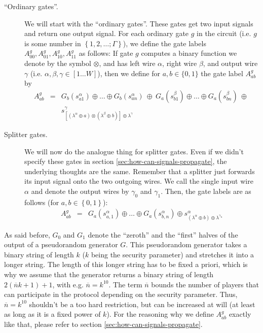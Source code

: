 \message{ !name(seminar.tex)}\documentclass{llncs}
\newcommand{\todo}[1]{ {\color{red}{\textbf{#1}}}}
\begin{document}
\begin{description}
\item[``Ordinary gates''.] We will start with the ``ordinary gates''. These gates get two input signals and return one output signal. For each ordinary gate $g$ in the circuit (i.e. $g$ is some number in $\left\{ 1,2,\dots;\Gamma \right\}$), we define the gate labels $A^g_{00}, A^g_{01}, A^g_{10}, A^g_{11}$ as follows: If gate $g$ computes a binary function we denote by the symbol $\otimes$, and has left wire $\alpha$, right wire $\beta$, and output wire $\gamma$ (i.e. $\alpha,\beta,\gamma\in[1\dots W]$), then we define for $a,b\in\{0,1\}$ the gate label $A_{ab}^g$ by
  \begin{eqnarray*}
    A_{ab}^g &= & G_b(s_{a1}^\alpha)\oplus\dots\oplus G_b(s_{an}^\alpha) 
              \ \oplus \ 
              G_a(s_{b1}^\beta)\oplus\dots\oplus G_a(s_{bn}^\beta)
              \ \oplus \ \\
             & & s_{[(\lambda^\alpha\oplus a)\otimes(\lambda^\beta\oplus b)]\oplus\lambda^\gamma}^\gamma
  \end{eqnarray*}
\item[Splitter gates.] We will now do the analogue thing for splitter gates. Even if we didn't specify these gates in section \ref{sec:how-can-signals-propagate}, the underlying thoughts are the same. Remember that a splitter just forwards its input signal onto the two outgoing wires. We call the single input wire $\alpha$ and denote the output wires by $\gamma_0$ and $\gamma_1$. Then, the gate labels are as follows (for $a,b\in\left\{ 0,1 \right\}$):
  \begin{eqnarray*}
    A_{ab}^g & = & G_a(s^\alpha_{a,1}) \oplus \dots \oplus G_a(s^\alpha_{b,n}) \oplus s^\alpha_{(\lambda^\alpha\oplus b)\oplus\lambda^{\gamma_a}}
  \end{eqnarray*}
\end{description}
\todo{Gate labels für splitter nochmal checken!}

As said before, $G_0$ and $G_1$ denote the ``zeroth'' and the ``first'' halves of the output of a pseudorandom generator $G$. This pseudorandom generator takes a binary string of length $k$ ($k$ being the security parameter) and stretches it into a longer string. The length of this longer string has to be fixed a priori, which is why we assume that the generator returns a binary string of length $2(\overline{n}k+1)+1$, with e.g. $\overline{n}=k^{10}$. The term $\overline{n}$ bounds the number of players that can participate in the protocol depending on the security parameter. Thus, $\overline{n}=k^{10}$ shouldn't be a too hard restriction, but can be increased at will (at least as long as it is a fixed power of $k$). For the reasoning why we define $A^g_{ab}$ exactly like that, please refer to section \ref{sec:how-can-signals-propagate}.
\end{document}
